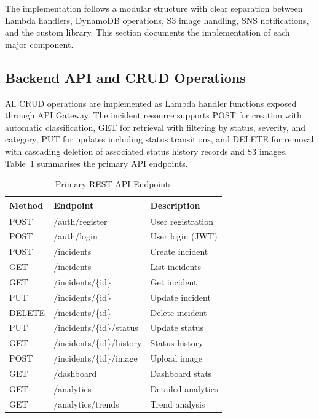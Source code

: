 \documentclass[conference]{IEEEtran}
\begin{document}
The implementation follows a modular structure with clear separation between Lambda handlers, DynamoDB operations, S3 image handling, SNS notifications, and the custom library. This section documents the implementation of each major component.

\subsection{Backend API and CRUD Operations}

All CRUD operations are implemented as Lambda handler functions exposed through API Gateway. The incident resource supports POST for creation with automatic classification, GET for retrieval with filtering by status, severity, and category, PUT for updates including status transitions, and DELETE for removal with cascading deletion of associated status history records and S3 images. Table~\ref{tab:endpoints} summarises the primary API endpoints.

\begin{table}[H]
\centering
\caption{Primary REST API Endpoints}
\label{tab:endpoints}
\begin{tabular}{|l|l|l|}
\hline
\textbf{Method} & \textbf{Endpoint} & \textbf{Description} \\
\hline
POST & /auth/register & User registration \\
POST & /auth/login & User login (JWT) \\
\hline
POST & /incidents & Create incident \\
GET & /incidents & List incidents \\
GET & /incidents/\{id\} & Get incident \\
PUT & /incidents/\{id\} & Update incident \\
DELETE & /incidents/\{id\} & Delete incident \\
\hline
PUT & /incidents/\{id\}/status & Update status \\
GET & /incidents/\{id\}/history & Status history \\
\hline
POST & /incidents/\{id\}/image & Upload image \\
\hline
GET & /dashboard & Dashboard stats \\
GET & /analytics & Detailed analytics \\
GET & /analytics/trends & Trend analysis \\
\hline
\end{tabular}
\end{table}
\end{document}
